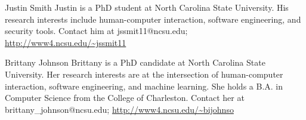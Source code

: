 \documentclass[10pt,journal,compsoc]{IEEEtran}
\begin{document}


%


% 

\begin{IEEEbiography}{Justin Smith}
	Justin is a PhD student at North Carolina State University. His research interests include human-computer interaction, software engineering, and security tools. 
	Contact him at jssmit11@ncsu.edu; 
	\url{http://www4.ncsu.edu/~jssmit11}
\end{IEEEbiography}

\begin{IEEEbiography}{Brittany Johnson}
	Brittany is a PhD candidate at North Carolina State University. Her research interests are at the intersection of human-computer interaction, software engineering, and machine learning. She holds a B.A. in Computer Science from the College of Charleston. 
	Contact her at brittany\_johnson@ncsu.edu; 
	\url{http://www4.ncsu.edu/~bijohnso}
\end{IEEEbiography}
\end{document}
